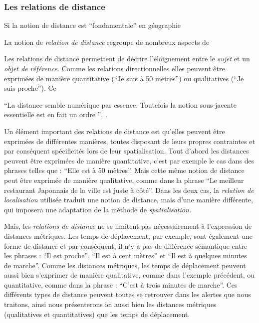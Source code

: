 \subsubsection{Les relations de distance}

Si la notion de distance est \enquote{fondamentale} en géographie
\autocite{Pumain1997}

La notion de \emph{relation de distance} regroupe de nombreux aspects
de  

Les relations de distance permettent de décrire l'éloignement entre le
\emph{sujet} et un \emph{objet de référence.} Comme les relations
directionnelles elles peuvent être exprimées de manière quantitative
(\eg \enquote{Je suis à 50 mètres}) ou qualitatives (\eg \enquote{Je
  suis proche}). Ce



\enquote{La distance \textelp{} semble \textelp{} numérique par
  essence. Toutefois \textelp{} la notion sous-jacente essentielle est
  en fait un ordre \textelp{}}, \textcite{Aurnague1997}.

Un élément important des relations de distance est qu'elles peuvent
être exprimées de différentes manières, toutes disposant de leurs
propres contraintes et par conséquent spécificités lors de leur
spatialisation. Tout d'abord les distances peuvent être exprimées de
manière quantitative, c'est par exemple le cas dans des phrases telles
que : \enquote{Elle est à 50 mètres}. Mais cette même notion de
distance peut être exprimée de manière qualitative, comme dans la
phrase \enquote{Le meilleur restaurant Japonnais de la ville est juste
  à côté}. Dans les deux cas, la \emph{relation de localisation}
utilisée traduit une notion de distance, mais d'une manière
différente, qui imposera une adaptation de la méthode de
\emph{spatialisation.}

Mais, les \emph{relations de distance} ne se limitent pas
nécessairement à l'expression de distances métriques. Les temps de
déplacement, par exemple, sont également une forme de distance et par
conséquent, il n'y a pas de différence sémantique entre les phrases :
\enquote{Il est proche}, \enquote{Il est à cent mètres} et \enquote{Il
  est à quelques minutes de marche}. Comme les distances métriques,
les temps de déplacement peuvent aussi bien s'exprimer de manière
qualitative, comme dans l'exemple précédent, ou quantitative, comme
dans la phrase : \enquote{C'est à trois minutes de marche}.  Ces
différents types de distance peuvent toutes se retrouver dans les
alertes que nous traitons, ainsi nous présenterons ici aussi bien les
distances métriques (qualitatives et quantitatives) que les temps de
déplacement.

